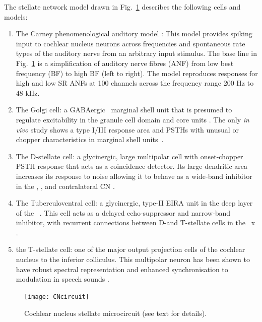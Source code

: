   The stellate network model drawn in
Fig.~\ref{fig:microcircuit} describes the following cells and models:
\begin{enumerate}
\item The Carney phenomenological auditory model
  \citet{ZilanyBruceEtAl:2009}: This model provides spiking input to
  cochlear nucleus neurons across frequencies and spontaneous rate
  types of the auditory nerve from an arbitrary input stimulus. The
  base line in Fig.~\ref{fig:microcircuit} is a simplification of
  auditory nerve fibres (ANF) from low best frequency (BF) to high BF
  (left to right). The model reproduces responses for high and low SR
  ANFs at 100 channels across the frequency range 200 Hz to 48 kHz.
\item The Golgi cell: a GABAergic \VCN~marginal shell unit that is presumed to
  regulate excitability in the granule cell domain and core \VCN units
  \citep{FerragamoGoldingEtAl:1998}. The only \textit{in vivo} study shows a type
  I/III response area and PSTHs with unusual or chopper characteristics in
  marginal shell units~\citep{GhoshalKim:1997}.
\item The D-stellate cell: a glycinergic, large multipolar cell with
  onset-chopper PSTH response that acts as a coincidence detector. Its
  large dendritic area increases its response to noise allowing it to
  behave as a wide-band inhibitor in the \VCN, \DCN, and contralateral CN 
  \citep{SmithMassieEtAl:2005,ArnottWallaceEtAl:2004,NeedhamPaolini:2007}.
\item The Tuberculoventral cell: a glycinergic, type-II EIRA unit in the deep
  layer of the \DCN~\citep{SpirouDavisEtAl:1999}.  This cell acts as a delayed
  echo-suppressor and narrow-band inhibitor, with recurrent connections between
  D-and T-stellate cells in the \VCN\ x 
  \citep{Alibardi:2006,OertelWickesberg:1993,WickesbergWhitlonEtAl:1991}.
\item the T-stellate cell: one of the major output projection cells of the
  cochlear nucleus to the inferior colliculus. This multipolar neuron has been
  shown to have robust spectral representation and enhanced synchronisation to
  modulation in speech sounds
  \citep{BlackburnSachs:1990,KeilsonRichardsEtAl:1997}.
\end{enumerate}

\begin{figure}[ht!]
  \centering
  \texttt{[image: CNcircuit]}
  \caption{Cochlear nucleus stellate microcircuit (see text for details). }
  \label{fig:microcircuit}
\end{figure}

